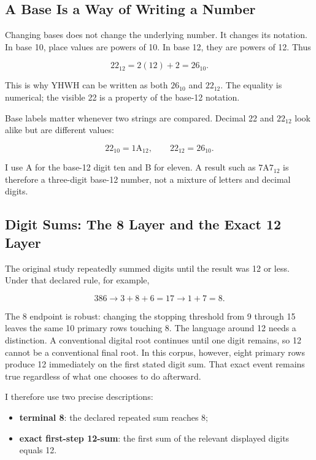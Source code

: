 \subsection{A Base Is a Way of Writing a Number}

Changing bases does not change the underlying number. It changes its notation. In base 10, place values are powers of 10. In base 12, they are powers of 12. Thus

\[
22_{12}=2(12)+2=26_{10}.
\]

This is why YHWH can be written as both $26_{10}$ and $22_{12}$. The equality is numerical; the visible 22 is a property of the base-12 notation.

Base labels matter whenever two strings are compared. Decimal 22 and $22_{12}$ look alike but are different values:

\[
22_{10}=1\mathrm{A}_{12},
\qquad
22_{12}=26_{10}.
\]

I use A for the base-12 digit ten and B for eleven. A result such as $7\mathrm{A}7_{12}$ is therefore a three-digit base-12 number, not a mixture of letters and decimal digits.

\subsection{Digit Sums: The 8 Layer and the Exact 12 Layer}

The original study repeatedly summed digits until the result was 12 or less. Under that declared rule, for example,

\[
386\rightarrow3+8+6=17\rightarrow1+7=8.
\]

The 8 endpoint is robust: changing the stopping threshold from 9 through 15 leaves the same 10 primary rows touching 8. The language around 12 needs a distinction. A conventional digital root continues until one digit remains, so 12 cannot be a conventional final root. In this corpus, however, eight primary rows produce 12 immediately on the first stated digit sum. That exact event remains true regardless of what one chooses to do afterward.

I therefore use two precise descriptions:

\begin{itemize}
\item \textbf{terminal 8}: the declared repeated sum reaches 8;
\item \textbf{exact first-step 12-sum}: the first sum of the relevant displayed digits equals 12.
\end{itemize}

